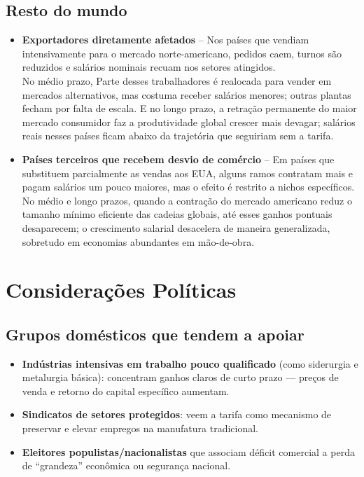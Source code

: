 \documentclass[a4paper,12pt]{article}[abntex2]
\begin{document}
\subsection*{\textbf{Resto do mundo}}

\begin{itemize}
  \item \textbf{Exportadores diretamente afetados} – Nos países que vendiam intensivamente para o mercado norte-americano, pedidos caem, turnos são reduzidos e salários nominais recuam nos setores atingidos.\\
  No médio prazo, Parte desses trabalhadores é realocada para vender em mercados alternativos, mas costuma receber salários menores; outras plantas fecham por falta de escala.
  E no longo prazo, a retração permanente do maior mercado consumidor faz a produtividade global crescer mais devagar; salários reais nesses países ficam abaixo da trajetória que seguiriam sem a tarifa.
  
  \item \textbf{Países terceiros que recebem desvio de comércio} – Em países que substituem parcialmente as vendas aos EUA, alguns ramos contratam mais e pagam salários um pouco maiores, mas o efeito é restrito a nichos específicos.\\
  No médio e longo prazos, quando a contração do mercado americano reduz o tamanho mínimo eficiente das cadeias globais, até esses ganhos pontuais desaparecem; o crescimento salarial desacelera de maneira generalizada, sobretudo em economias abundantes em mão-de-obra.
\end{itemize}

\section*{\textbf{Considerações Políticas}}


\subsection*{\textbf{Grupos domésticos que tendem a apoiar}}

\begin{itemize}
    \item \textbf{Indústrias intensivas em trabalho pouco qualificado} (como siderurgia e metalurgia básica): concentram ganhos claros de curto prazo — preços de venda e retorno do capital específico aumentam.  
    \item \textbf{Sindicatos de setores protegidos}: veem a tarifa como mecanismo de preservar e elevar empregos na manufatura tradicional. 
    \item \textbf{Eleitores populistas/nacionalistas} que associam déficit comercial a perda de “grandeza” econômica ou segurança nacional.
\end{itemize}
\end{document}
